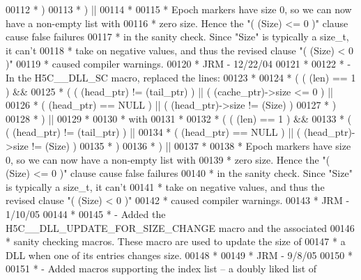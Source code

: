 \begin{DoxyCode}
00112 \textcolor{comment}{ *      )}
00113 \textcolor{comment}{ *    ) ||}
00114 \textcolor{comment}{ *}
00115 \textcolor{comment}{ *    Epoch markers have size 0, so we can now have a non-empty list with}
00116 \textcolor{comment}{ *    zero size.  Hence the "( (Size) <= 0 )" clause cause false failures}
00117 \textcolor{comment}{ *    in the sanity check.  Since "Size" is typically a size\_t, it can't}
00118 \textcolor{comment}{ *    take on negative values, and thus the revised clause "( (Size) < 0 )"}
00119 \textcolor{comment}{ *    caused compiler warnings.}
00120 \textcolor{comment}{ *                                                     JRM - 12/22/04}
00121 \textcolor{comment}{ *}
00122 \textcolor{comment}{ *  - In the H5C\_\_DLL\_SC macro, replaced the lines:}
00123 \textcolor{comment}{ *}
00124 \textcolor{comment}{ *    ( ( (len) == 1 ) &&}
00125 \textcolor{comment}{ *      ( ( (head\_ptr) != (tail\_ptr) ) || ( (cache\_ptr)->size <= 0 ) ||}
00126 \textcolor{comment}{ *        ( (head\_ptr) == NULL ) || ( (head\_ptr)->size != (Size) )}
00127 \textcolor{comment}{ *      )}
00128 \textcolor{comment}{ *    ) ||}
00129 \textcolor{comment}{ *}
00130 \textcolor{comment}{ *    with}
00131 \textcolor{comment}{ *}
00132 \textcolor{comment}{ *    ( ( (len) == 1 ) &&}
00133 \textcolor{comment}{ *      ( ( (head\_ptr) != (tail\_ptr) ) ||}
00134 \textcolor{comment}{ *        ( (head\_ptr) == NULL ) || ( (head\_ptr)->size != (Size) )}
00135 \textcolor{comment}{ *      )}
00136 \textcolor{comment}{ *    ) ||}
00137 \textcolor{comment}{ *}
00138 \textcolor{comment}{ *    Epoch markers have size 0, so we can now have a non-empty list with}
00139 \textcolor{comment}{ *    zero size.  Hence the "( (Size) <= 0 )" clause cause false failures}
00140 \textcolor{comment}{ *    in the sanity check.  Since "Size" is typically a size\_t, it can't}
00141 \textcolor{comment}{ *    take on negative values, and thus the revised clause "( (Size) < 0 )"}
00142 \textcolor{comment}{ *    caused compiler warnings.}
00143 \textcolor{comment}{ *                                                     JRM - 1/10/05}
00144 \textcolor{comment}{ *}
00145 \textcolor{comment}{ *  - Added the H5C\_\_DLL\_UPDATE\_FOR\_SIZE\_CHANGE macro and the associated}
00146 \textcolor{comment}{ *    sanity checking macros.  These macro are used to update the size of}
00147 \textcolor{comment}{ *    a DLL when one of its entries changes size.}
00148 \textcolor{comment}{ *}
00149 \textcolor{comment}{ *                          JRM - 9/8/05}
00150 \textcolor{comment}{ *}
00151 \textcolor{comment}{ *  - Added macros supporting the index list -- a doubly liked list of }

\end{DoxyCode}

